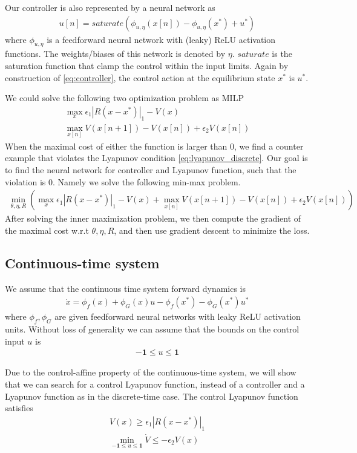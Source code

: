 \documentclass{article}
\begin{document}
Our controller is also represented by a neural network as
\begin{align}
	u[n] = saturate(\phi_{u, \eta}(x[n]) - \phi_{u, \eta}(x^*) + u^*)\label{eq:controller}
\end{align}
where $\phi_{u, \eta}$ is a feedforward neural network with (leaky) ReLU activation functions. The weights/biases of this network is denoted by $\eta$. $saturate$ is the saturation function that clamp the control within the input limits. Again by construction of \eqref{eq:controller}, the control action at the equilibrium state $x^*$ is $u^*$.

We could solve the following two optimization problem as MILP
\begin{align}
	\max_{x} \epsilon_1|R(x-x^*)|_1 - V(x)\\
	\max_{x[n]} V(x[n+1]) - V(x[n]) + \epsilon_2V(x[n])
\end{align}
When the maximal cost of either the function is larger than 0, we find a counter example that violates the Lyapunov condition \eqref{eq:lyapunov_discrete}. Our goal is to find the neural network for controller and Lyapunov function, such that the violation is 0. Namely we solve the following min-max problem.
\begin{align}
	\min_{\theta, \eta, R} \left(\max_{x}\epsilon_1|R(x-x^*)|_1 - V(x) + \max_{x[n]} V(x[n+1]) - V(x[n]) + \epsilon_2V(x[n])\right)
\end{align}
After solving the inner maximization problem, we then compute the gradient of the maximal cost w.r.t $\theta, \eta, R$, and then use gradient descent to minimize the loss.

\subsection{Continuous-time system}
We assume that the continuous time system forward dynamics is
\begin{align}
	\dot{x} = \phi_f(x) + \phi_G(x)u - \phi_f(x^*) - \phi_G(x^*)u^*
\end{align}
where $\phi_f, \phi_G$ are given feedforward neural networks with leaky ReLU activation units. Without loss of generality we can assume that the bounds on the control input $u$ is 
\begin{align}
	-\mathbf{1}\le u \le \mathbf{1}
\end{align}

Due to the control-affine property of the continuous-time system, we will show that we can search for a control Lyapunov function, instead of a controller and a Lyapunov function as in the discrete-time case. The control Lyapunov function satisfies
\begin{subequations}
\begin{align}
	V(x) \ge \epsilon_1|R(x-x^*)|_1\\
	\min_{-\mathbf{1}\le u\le \mathbf{1}} \dot{V}\le -\epsilon_2V(x)\label{eq:lyapunov_condition_Vdot_continuous}
\end{align}
\label{eq:lyapunov_condition_continuous}
\end{subequations}
\end{document}
